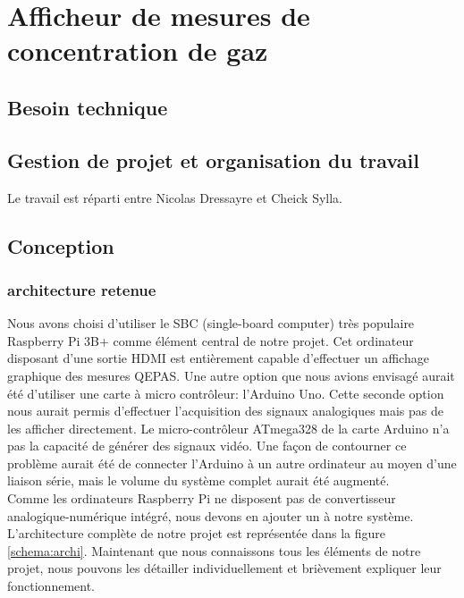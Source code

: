 \documentclass[a4paper]{report}
\begin{document}
	\chapter{Afficheur de mesures de concentration de gaz}
	
	
	\section{Besoin technique}
	
	\section{Gestion de projet et organisation du travail}
	Le travail est réparti entre Nicolas Dressayre et Cheick Sylla. 
	
	\section{Conception}
	\subsection{architecture retenue}
	Nous avons choisi d'utiliser le SBC (single-board computer) très populaire Raspberry Pi 3B+ comme élément central de notre projet. Cet ordinateur disposant d'une sortie HDMI est entièrement capable d'effectuer un affichage graphique des mesures QEPAS. Une autre option que nous avions envisagé aurait été d'utiliser une carte à micro contrôleur: l'Arduino Uno. Cette seconde option nous aurait permis d'effectuer l'acquisition des signaux analogiques mais pas de les afficher directement. Le micro-contrôleur ATmega328 de la carte Arduino n'a pas la capacité de générer des signaux vidéo. Une façon de contourner ce problème aurait été de connecter l'Arduino à un autre ordinateur au moyen d'une liaison série, mais le volume du système complet aurait été augmenté.\\
	
	Comme les ordinateurs Raspberry Pi ne disposent pas de convertisseur analogique-numérique intégré, nous devons en ajouter un à notre système.\\
	
	L'architecture complète de notre projet est représentée dans la figure \ref{schema:archi}. Maintenant que nous connaissons tous les éléments de notre projet, nous pouvons les détailler individuellement et brièvement expliquer leur fonctionnement.
	
\end{document}
